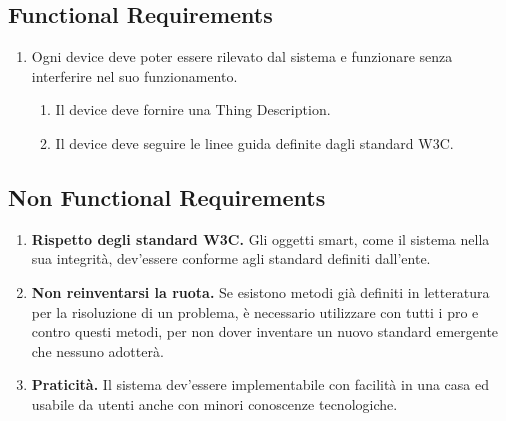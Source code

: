 \documentclass[12pt,a4paper,openright,oneside]{report}
\begin{document}
\subsection{Functional Requirements}
\begin{enumerate}
	\item Ogni device deve poter essere rilevato dal sistema e funzionare senza interferire nel suo funzionamento.
	\begin{enumerate}[label*=\arabic*.]
		\item Il device deve fornire una Thing Description.
		\item Il device deve seguire le linee guida definite dagli standard W3C.
	\end{enumerate}
	

\end{enumerate}

\subsection{Non Functional Requirements}
\begin{enumerate}[label*=\arabic*.]
	\item \textbf{Rispetto degli standard W3C.} Gli oggetti smart, come il sistema nella sua integrità, dev'essere conforme agli standard definiti dall'ente.
	
	\item \textbf{Non reinventarsi la ruota.} Se esistono metodi già definiti in letteratura per la risoluzione di un problema, è necessario utilizzare con tutti i pro e contro questi metodi, per non dover inventare un nuovo standard emergente che nessuno adotterà.
	
	\item \textbf{Praticità.} Il sistema dev'essere implementabile con facilità in una casa ed usabile da utenti anche con minori conoscenze tecnologiche.
\end{enumerate}
\end{document}
